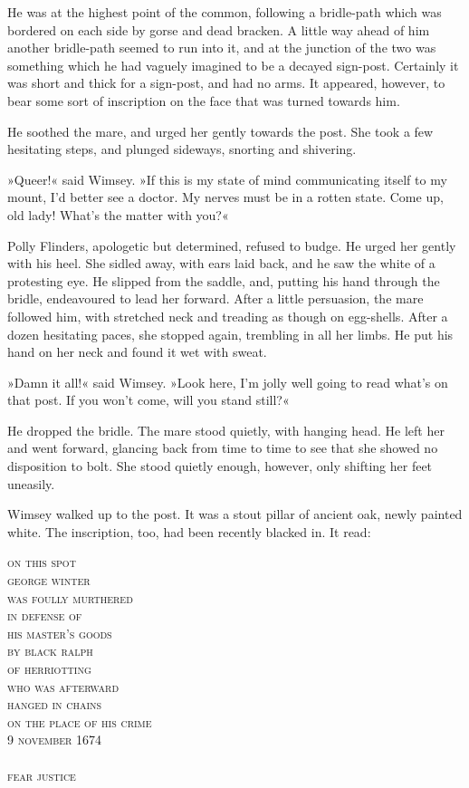 He was at the highest point of the common, following a bridle-path which was bordered on each side by gorse and dead bracken. A little way ahead of him another bridle-path seemed to run into it, and at the junction of the two was something which he had vaguely imagined to be a decayed sign-post. Certainly it was short and thick for a sign-post, and had no arms. It appeared, however, to bear some sort of inscription on the face that was turned towards him.

He soothed the mare, and urged her gently towards the post. She took a few hesitating steps, and plunged sideways, snorting and shivering.

»Queer!« said Wimsey. »If this is my state of mind communicating itself to my mount, I'd better see a doctor. My nerves must be in a rotten state. Come up, old lady! What's the matter with you?«

Polly Flinders, apologetic but determined, refused to budge. He urged her gently with his heel. She sidled away, with ears laid back, and he saw the white of a protesting eye. He slipped from the saddle, and, putting his hand through the bridle, endeavoured to lead her forward. After a little persuasion, the mare followed him, with stretched neck and treading as though on egg-shells. After a dozen hesitating paces, she stopped again, trembling in all her limbs. He put his hand on her neck and found it wet with sweat.

»Damn it all!« said Wimsey. »Look here, I'm jolly well going to read what's on that post. If you won't come, will you stand still?«

He dropped the bridle. The mare stood quietly, with hanging head. He left her and went forward, glancing back from time to time to see that she showed no disposition to bolt. She stood quietly enough, however, only shifting her feet uneasily.

Wimsey walked up to the post. It was a stout pillar of ancient oak, newly painted white. The inscription, too, had been recently blacked in. It read:

\begin{center}\scshape
on this spot\\
george winter\\
was foully murthered\\
in defense of\\
his master's goods\\
by black ralph\\
of herriotting\\
who was afterward\\
hanged in chains\\
on the place of his crime\\
9 november 1674\\
~\\
fear justice
\end{center}

